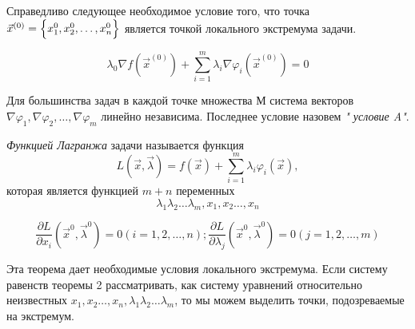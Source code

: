 Справедливо следующее необходимое условие того, что точка  $\vec x{}^{(0)}=\Bigl\{x_{1}^0,x_{2}^0,\dots,x_{n}^0\Bigr\}$ является точкой локального экстремума задачи.


\[\lambda_0 \nabla f(\vec x^{(0)})+\sum\limits_{i=1}^m \lambda_i\nabla\varphi_i(\vec x^{(0)}) = 0\]

Для большинства задач в каждой точке множества М система векторов $\nabla\varphi_1,\nabla\varphi_2,\dots,\nabla\varphi_m$ линейно независима. Последнее условие
назовем \textit{" условие A"}.

\textit{Функцией Лагранжа} задачи называется функция
\[L(\vec x,\vec \lambda) = f(\vec x) + \sum\limits_{i=1}^m \lambda_i\varphi_i(\vec x),\]
которая является функцией $m + n$ переменных
\[\lambda_1\lambda_2\dots\lambda_m,x_1,x_2\dots,x_n\]

\[
    \frac {\partial L}{\partial x_i}(\vec x^{0},\vec \lambda^{0}) = 0(i = 1,2,\dots,n);  \frac {\partial L}{\partial \lambda_j}(\vec x^{0},\vec \lambda^{0}) = 0(j = 1,2,\dots,m)
\]

Эта теорема дает необходимые условия локального экстремума. Если систему равенств теоремы 2 рассматривать, как систему уравнений относительно неизвестных
$x_1,x_2\dots,x_n,\lambda_1\lambda_2\dots\lambda_m$, то мы можем выделить точки, подозреваемые на экстремум.

